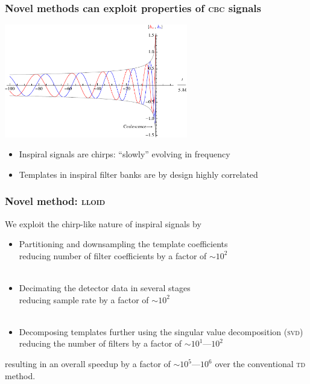 \documentclass{beamer}
\begin{document}
\begin{frame}
	\frametitle{Novel methods can exploit properties of \textsc{cbc} signals}
	\begin{center}
		\includegraphics[width=8cm]{figures/inspiral-waveform}
	\end{center}
	\begin{itemize}
		\item Inspiral signals are chirps: ``slowly'' evolving in frequency
		\item Templates in inspiral filter banks are by design highly correlated
	\end{itemize}
\end{frame}

\begin{frame}
	\frametitle{Novel method: \textsc{lloid}}

	We exploit the chirp-like nature of inspiral signals by

	\begin{itemize}
		\item Partitioning and downsampling the template coefficients \\ \footnotesize{reducing number of filter coefficients by a factor of {\color{ink3}$\sim 10^2$}} \\~\\

		\item Decimating the detector data in several stages \\ \footnotesize{reducing sample rate by a factor of {\color{ink3}$\sim 10^2$}} \\~\\

		\item Decomposing templates further using the singular value decomposition (\textsc{svd})
		\footnotesize{reducing the number of filters by a factor of {\color{ink3}$\sim 10^1 \textrm{---} 10^2$}}
	\end{itemize}

	resulting in an overall speedup by a factor of {\color{ink3}$\sim 10^5 \textrm{---} 10^6$} over the conventional \textsc{td} method.
\end{frame}
\end{document}
